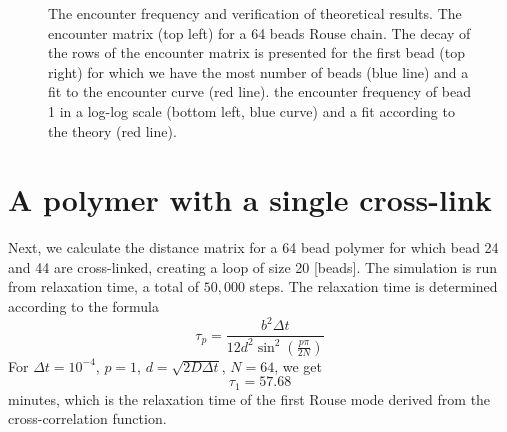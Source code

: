\documentclass[12pt]{book}
\begin{document}
\begin{figure}[H]
\caption{\scriptsize{The encounter frequency and verification of theoretical results. The encounter matrix (top left) for a 64 beads Rouse chain. The decay of the rows of the encounter matrix is presented for the first bead (top right) for which we have the most number of beads (blue line) and a fit to the encounter curve (red line). the encounter frequency of bead 1 in a log-log scale (bottom left, blue curve) and a fit according to the theory (red line).}}
\label{figure_encounterMatrix64Beads}
\end{figure}

\section{A polymer with a single cross-link}\label{section_aPolymerwithASingleCrossLink}
Next, we calculate the distance matrix for a 64 bead polymer for which bead 24 and 44 are cross-linked, creating a loop of size 20 [beads]. 
The simulation is run from relaxation time, a total of $50,000$ steps. The relaxation time is determined according to the formula
\begin{equation}
\tau_p = \frac{b^2\Delta t}{12d^2\sin^2(\frac{p\pi}{2N})}
\end{equation}
For  $\Delta t=10^{-4}$, $p=1$, $d=\sqrt{2D\Delta t}$, $N = 64$, we get 
\begin{equation}
\tau_1 = 57.68 
\end{equation}
minutes, which is the relaxation time of the first Rouse mode derived from the cross-correlation function. 
\end{document}
